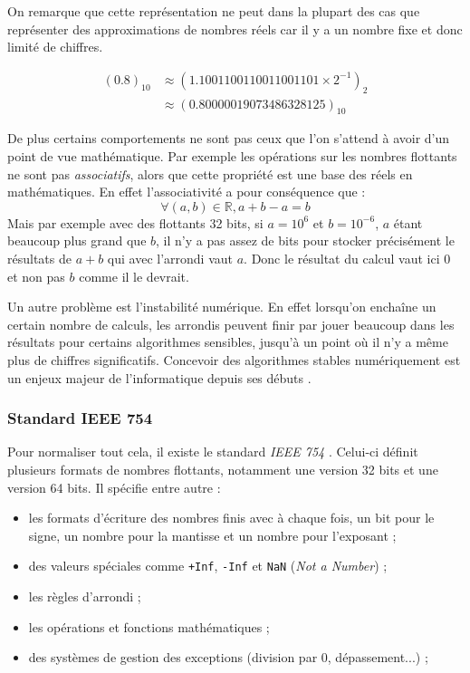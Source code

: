 \documentclass[a4paper,11pt]{report}
\begin{document}
On remarque que cette représentation ne peut dans la plupart des cas que représenter des approximations de nombres réels car il y a un nombre fixe et donc limité de chiffres.

\begin{displaymath}
    \begin{split}
        (0.8)_{10} & \approx (1.1001100110011001101 \times 2^{-1})_{2} \\
        & \approx (0.80000019073486328125)_{10}
    \end{split}
\end{displaymath}

De plus certains comportements ne sont pas ceux que l'on s'attend à avoir d'un point de vue mathématique.
Par exemple les opérations sur les nombres flottants ne sont pas \emph{associatifs}, alors que cette propriété est une base des réels en mathématiques.
En effet l'associativité a pour conséquence que :
$$\forall (a, b) \in \mathbb{R}, a+b-a=b$$
Mais par exemple avec des flottants 32 bits, si $a=10^{6}$ et $b=10^{-6}$, $a$ étant beaucoup plus grand que $b$,
il n'y a pas assez de bits pour stocker précisément le résultats de $a+b$ qui avec l'arrondi vaut $a$.
Donc le résultat du calcul vaut ici $0$ et non pas $b$ comme il le devrait.

Un autre problème est l'instabilité numérique.
En effet lorsqu'on enchaîne un certain nombre de calculs, les arrondis peuvent finir par jouer beaucoup dans les résultats pour certains algorithmes sensibles, jusqu'à un point où il n'y a même plus de chiffres significatifs.
Concevoir des algorithmes stables numériquement est un enjeux majeur de l'informatique depuis ses débuts \cite{19770005172}.

\subsubsection{Standard IEEE 754}

Pour normaliser tout cela, il existe le standard \emph{IEEE 754} \cite{8766229}.
Celui-ci définit plusieurs formats de nombres flottants, notamment une version 32 bits et une version 64 bits. Il spécifie entre autre :
\begin{itemize}
    \item les formats d'écriture des nombres finis avec à chaque fois, un bit pour le signe, un nombre pour la mantisse et un nombre pour l'exposant ;
    \item des valeurs spéciales comme \verb'+Inf', \verb'-Inf' et \verb'NaN' (\emph{Not a Number}) ;
    \item les règles d'arrondi ;
    \item les opérations et fonctions mathématiques ;
    \item des systèmes de gestion des exceptions (division par 0, dépassement...) ;
\end{itemize}
\end{document}
